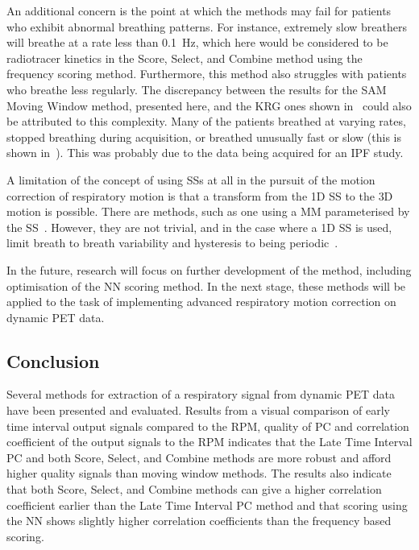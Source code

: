             An additional concern is the point at which the methods may fail for patients who exhibit abnormal breathing patterns. For instance, extremely slow breathers will breathe at a rate less than \SI{0.1}{\hertz}, which here would be considered to be radiotracer kinetics in the Score, Select, and Combine method using the frequency scoring method. Furthermore, this method also struggles with patients who breathe less regularly. The discrepancy between the results for the \gls{SAM} Moving Window method, presented here, and the \gls{KRG} ones shown in~\parencite{Schleyer2014} could also be attributed to this complexity. Many of the patients breathed at varying rates, stopped breathing during acquisition, or breathed unusually fast or slow (this is shown in~). This was probably due to the data being acquired for an \gls{IPF} study.
        
            A limitation of the concept of using \glspl{SS} at all in the pursuit of the motion correction of respiratory motion is that a transform from the \gls{1D} \gls{SS} to the \gls{3D} motion is possible. There are methods, such as one using a \gls{MM} parameterised by the \gls{SS}~\parencite{McClelland2017, McClelland2013}. However, they are not trivial, and in the case where a \gls{1D} \gls{SS} is used, limit breath to breath variability and hysteresis to being periodic~\parencite{Whitehead2021ComparisonMap}.
        
            In the future, research will focus on further development of the method, including optimisation of the \gls{NN} scoring method. In the next stage, these methods will be applied to the task of implementing advanced respiratory motion correction on dynamic \gls{PET} data.

        \subsection{Conclusion} \label{sec:pca_data_driven_surrogate_signal_extraction_methods_for_dynamic_pet_conclusion}
            Several methods for extraction of a respiratory signal from dynamic \gls{PET} data have been presented and evaluated. Results from a visual comparison of early time interval output signals compared to the \gls{RPM}, quality of \gls{PC} and correlation coefficient of the output signals to the \gls{RPM} indicates that the Late Time Interval \gls{PC} and both Score, Select, and Combine methods are more robust and afford higher quality signals than moving window methods. The results also indicate that both Score, Select, and Combine methods can give a higher correlation coefficient earlier than the Late Time Interval \gls{PC} method and that scoring using the \gls{NN} shows slightly higher correlation coefficients than the frequency based scoring.
        
